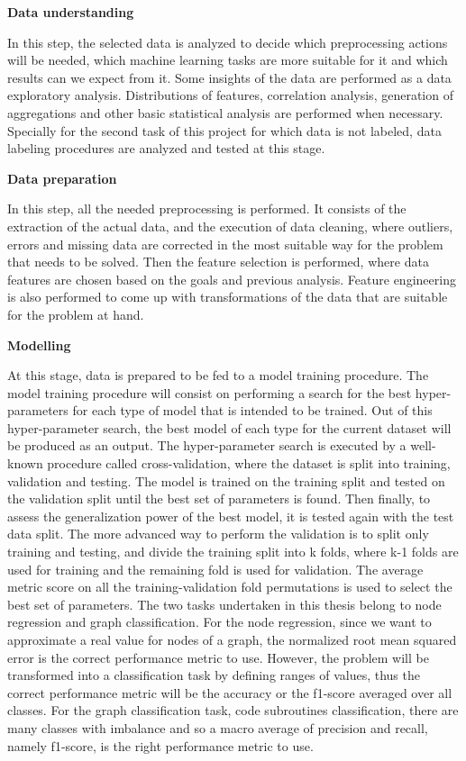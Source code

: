 \textbf{Data understanding}

In this step, the selected data is analyzed to decide which preprocessing actions will be needed, which machine learning tasks are more suitable for it and which results can we expect from it. 
Some insights of the data are performed as a data exploratory analysis. Distributions of features, correlation analysis, generation of aggregations and other basic statistical analysis are performed when necessary.
Specially for the second task of this project for which data is not labeled, data labeling procedures are analyzed and tested at this stage.

\textbf{Data preparation}

In this step, all the needed preprocessing is performed. It consists of the extraction of the actual data, and the execution of data cleaning, where outliers, errors and missing data are corrected in the most suitable way for the problem that needs to be solved. Then the feature selection is performed, where data features are chosen based on the goals and previous analysis. Feature engineering is also performed to come up with transformations of the data that are suitable for the problem at hand.


\textbf{Modelling}

At this stage, data is prepared to be fed to a model training procedure. The model training procedure will consist on performing a search for the best hyper-parameters for each type of model that is intended to be trained. Out of this hyper-parameter search, the best model of each type for the current dataset will be produced as an output. 
The hyper-parameter search is executed by a well-known procedure called cross-validation, where the dataset is split into training, validation and testing. The model is trained on the training split and tested on the validation split until the best set of parameters is found. Then finally, to assess the generalization power of the best model, it is tested again with the test data split. 
The more advanced way to perform the validation is to split only training and testing, and divide the training split into k folds, where k-1 folds are used for training and the remaining fold is used for validation. The average metric score on all the training-validation fold permutations is used to select the best set of parameters.
The two tasks undertaken in this thesis belong to node regression and graph classification. For the node regression, since we want to approximate a real value for nodes of a graph, the normalized root mean squared error is the correct performance metric to use.  However, the problem will be transformed into a classification task by defining ranges of values, thus the correct performance metric will be the accuracy or the f1-score averaged over all classes. For the graph classification task, code subroutines classification, there are many classes with imbalance and so a macro average of precision and recall, namely f1-score, is the right performance metric to use.

